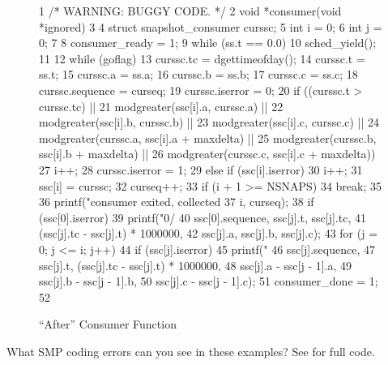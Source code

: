 \begin{figure}[htbp]
{ \scriptsize
\begin{verbbox}
  1 /* WARNING: BUGGY CODE. */
  2 void *consumer(void *ignored)
  3 {
  4   struct snapshot_consumer curssc;
  5   int i = 0;
  6   int j = 0;
  7
  8   consumer_ready = 1;
  9   while (ss.t == 0.0) {
 10     sched_yield();
 11   }
 12   while (goflag) {
 13     curssc.tc = dgettimeofday();
 14     curssc.t = ss.t;
 15     curssc.a = ss.a;
 16     curssc.b = ss.b;
 17     curssc.c = ss.c;
 18     curssc.sequence = curseq;
 19     curssc.iserror = 0;
 20     if ((curssc.t > curssc.tc) ||
 21         modgreater(ssc[i].a, curssc.a) ||
 22         modgreater(ssc[i].b, curssc.b) ||
 23         modgreater(ssc[i].c, curssc.c) ||
 24         modgreater(curssc.a, ssc[i].a + maxdelta) ||
 25         modgreater(curssc.b, ssc[i].b + maxdelta) ||
 26         modgreater(curssc.c, ssc[i].c + maxdelta)) {
 27       i++;
 28       curssc.iserror = 1;
 29     } else if (ssc[i].iserror)
 30       i++;
 31     ssc[i] = curssc;
 32     curseq++;
 33     if (i + 1 >= NSNAPS)
 34       break;
 35   }
 36   printf("consumer exited, collected %
 37          i, curseq);
 38   if (ssc[0].iserror)
 39     printf("0/%
 40            ssc[0].sequence, ssc[j].t, ssc[j].tc,
 41            (ssc[j].tc - ssc[j].t) * 1000000,
 42            ssc[j].a, ssc[j].b, ssc[j].c);
 43   for (j = 0; j <= i; j++)
 44     if (ssc[j].iserror)
 45       printf("%
 46              ssc[j].sequence,
 47              ssc[j].t, (ssc[j].tc - ssc[j].t) * 1000000,
 48              ssc[j].a - ssc[j - 1].a,
 49              ssc[j].b - ssc[j - 1].b,
 50              ssc[j].c - ssc[j - 1].c);
 51   consumer_done = 1;
 52 }
\end{verbbox}
}
\centering
\theverbbox
\caption{``After'' Consumer Function}
\label{fig:app:questions:After Consumer Function}
\end{figure}

\QuickQuiz{}
	What SMP coding errors can you see in these examples?
	See  for full code.
 \QuickQuizEnd

